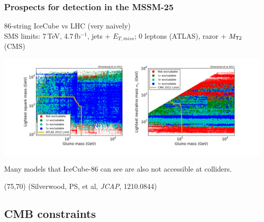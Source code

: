 \documentclass[xcolor=dvipsnames]{beamer}
\begin{document}
\begin{frame}
\frametitle{Prospects for detection in the MSSM-25}
86-string IceCube vs LHC (very naively)\\
{\scriptsize SMS limits: 7\,TeV, 4.7\,fb$^{-1}$, jets + $E_{T,miss}$; 0 leptons (ATLAS), razor + $M_{\sf T2}$ (CMS)}

\includegraphics[width=1.1\textwidth, trim = 50 0 0 0, clip=true]{MSSM25_LHC}

Many models that IceCube-86 can see are also not accessible at colliders.

\begin{textblock}{80}(75,70)
  {\tiny(Silverwood, PS, et al, \textit{JCAP}, 1210.0844)}
\end{textblock}

\end{frame}

\subsection{CMB constraints}
\end{document}
